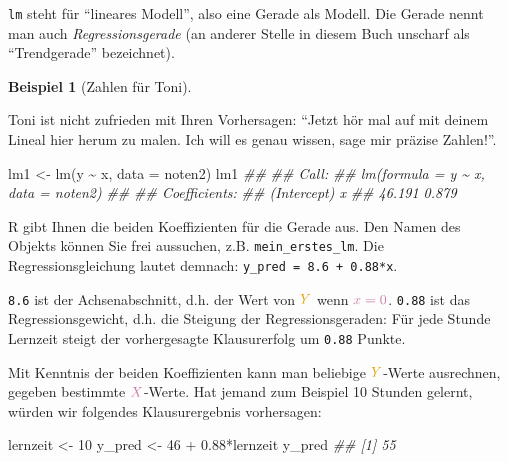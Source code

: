 \documentclass[
  letterpaper,
  twoside,
  open=any]{scrbook}
\newenvironment{Shaded}{\begin{snugshade}}{\end{snugshade}}
\newcommand{\AttributeTok}[1]{\textcolor[rgb]{0.40,0.45,0.13}{#1}}
\newcommand{\DecValTok}[1]{\textcolor[rgb]{0.68,0.00,0.00}{#1}}
\newcommand{\DocumentationTok}[1]{\textcolor[rgb]{0.37,0.37,0.37}{\textit{#1}}}
\newcommand{\FloatTok}[1]{\textcolor[rgb]{0.68,0.00,0.00}{#1}}
\newcommand{\FunctionTok}[1]{\textcolor[rgb]{0.28,0.35,0.67}{#1}}
\newcommand{\NormalTok}[1]{\textcolor[rgb]{0.00,0.23,0.31}{#1}}
\newcommand{\OtherTok}[1]{\textcolor[rgb]{0.00,0.23,0.31}{#1}}
\newcommand{\SpecialCharTok}[1]{\textcolor[rgb]{0.37,0.37,0.37}{#1}}
\theoremstyle{definition}
\theoremstyle{definition}
\newtheorem{example}{Beispiel}[chapter]
\theoremstyle{definition}
\theoremstyle{remark}
\begin{document}
\texttt{lm} steht für \enquote{lineares Modell}, also eine Gerade als
Modell. Die Gerade nennt man auch \emph{Regressionsgerade} (an anderer
Stelle in diesem Buch unscharf als \enquote{Trendgerade} bezeichnet).

\begin{example}[Zahlen für
Toni]\protect\hypertarget{exm-noten5}{}\label{exm-noten5}

Toni ist nicht zufrieden mit Ihren Vorhersagen: \enquote{Jetzt hör mal
auf mit deinem Lineal hier herum zu malen. Ich will es genau wissen,
sage mir präzise Zahlen!}.

\end{example}

\begin{Shaded}
\begin{Highlighting}[]
\NormalTok{lm1 }\OtherTok{\textless{}{-}} \FunctionTok{lm}\NormalTok{(y }\SpecialCharTok{\textasciitilde{}}\NormalTok{ x, }\AttributeTok{data =}\NormalTok{ noten2)}
\NormalTok{lm1}
\DocumentationTok{\#\# }
\DocumentationTok{\#\# Call:}
\DocumentationTok{\#\# lm(formula = y \textasciitilde{} x, data = noten2)}
\DocumentationTok{\#\# }
\DocumentationTok{\#\# Coefficients:}
\DocumentationTok{\#\# (Intercept)            x  }
\DocumentationTok{\#\#      46.191        0.879}
\end{Highlighting}
\end{Shaded}

R gibt Ihnen die beiden Koeffizienten für die Gerade aus. Den Namen des
Objekts können Sie frei aussuchen, z.B. \texttt{mein\_erstes\_lm}. Die
Regressionsgleichung lautet demnach:
\texttt{y\_pred\ =\ 8.6\ +\ 0.88*x}.

\texttt{8.6} ist der Achsenabschnitt, d.h. der Wert von
\(\color{ycol}{Y}\) wenn \(\color{xcol}{x}=0\). \texttt{0.88} ist das
Regressionsgewicht, d.h. die Steigung der Regressionsgeraden: Für jede
Stunde Lernzeit steigt der vorhergesagte Klausurerfolg um \texttt{0.88}
Punkte.

Mit Kenntnis der beiden Koeffizienten kann man beliebige
\(\color{ycol}{Y}\)-Werte ausrechnen, gegeben bestimmte
\(\color{xcol}{X}\)-Werte. Hat jemand zum Beispiel 10 Stunden gelernt,
würden wir folgendes Klausurergebnis vorhersagen:

\begin{Shaded}
\begin{Highlighting}[]
\NormalTok{lernzeit }\OtherTok{\textless{}{-}} \DecValTok{10}
\NormalTok{y\_pred }\OtherTok{\textless{}{-}} \DecValTok{46} \SpecialCharTok{+} \FloatTok{0.88}\SpecialCharTok{*}\NormalTok{lernzeit}
\NormalTok{y\_pred}
\DocumentationTok{\#\# [1] 55}
\end{Highlighting}
\end{Shaded}
\end{document}
